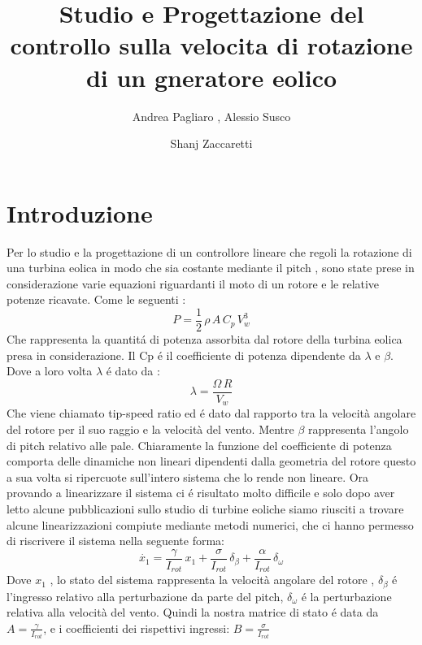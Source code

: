 \documentclass[a4paper,13pt]{article}
\begin{document}
\author{Andrea Pagliaro , Alessio Susco \and Shanj Zaccaretti}
\title{Studio e Progettazione del controllo sulla velocita di rotazione di un gneratore eolico}
\maketitle
\section{Introduzione}
Per lo studio e la progettazione di un controllore lineare che regoli la rotazione di una turbina eolica in modo che sia costante mediante il pitch , sono state prese in considerazione varie equazioni riguardanti il moto di un rotore e le relative potenze ricavate.
Come le seguenti :
\begin{equation}
P=\frac{1}{2}\,\rho\,A\,C_p\,V_w^3
\end{equation}
Che rappresenta la quantit\'a di potenza assorbita dal rotore della turbina eolica presa in considerazione.
Il Cp \'e il coefficiente di potenza dipendente da $\lambda$ e $\beta$.
Dove a loro volta $\lambda$ \'e dato da :
\begin{equation}
\lambda=\frac{\Omega\,R}{V_w}
\end{equation}
Che viene chiamato tip-speed ratio ed \'e dato dal rapporto tra la velocità angolare
del rotore per il suo raggio e la velocità del vento.
Mentre $\beta$ rappresenta l'angolo di pitch relativo alle pale.
Chiaramente la funzione del coefficiente di potenza comporta delle dinamiche non 
lineari dipendenti dalla geometria del rotore questo a sua volta si ripercuote sull'intero sistema che lo rende non lineare.  
Ora provando a linearizzare il sistema ci \'e risultato molto difficile e solo dopo aver letto alcune pubblicazioni sullo studio di turbine eoliche siamo riusciti a trovare alcune linearizzazioni compiute mediante metodi numerici, che ci hanno permesso di riscrivere il sistema nella seguente forma:
\begin{equation}
\dot{x_1}=\frac{\gamma}{I_{rot}}\,x_1+\frac{\sigma}{I_{rot}}\,\delta_\beta+\frac{\alpha}{I_{rot}}\,\delta_\omega
\end{equation}
Dove $x_1$ , lo stato del sistema rappresenta la velocità angolare del rotore ,
$\delta_\beta$ \'e l'ingresso relativo alla perturbazione da parte del pitch,
$\delta_\omega$ \'e la perturbazione relativa alla velocità del vento.
Quindi la nostra matrice di stato \'e data da $A=\frac{\gamma}{I_{rot}}$,
e i coefficienti dei rispettivi ingressi:
$B=\frac{\sigma}{I_{rot}}$
\end{document}

